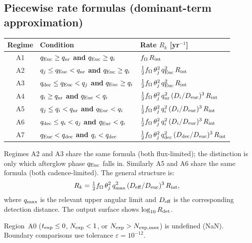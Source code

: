 \documentclass[11pt,a4paper]{article}
\begin{document}
\subsection{Piecewise rate formulas (dominant-term approximation)}

\begin{table}[h]
\centering
\small
\renewcommand{\arraystretch}{1.4}
\begin{tabular}{cll}
\toprule
Regime & Condition & Rate $R_k$ [yr$^{-1}$] \\
\midrule
A1 & $q_{\rm Euc}\ge q_{\rm nr}$ \textbf{and} $q_{\rm Euc}\ge q_i$ & $f_\Omega\,R_{\rm int}$ \\
A2 & $q_j\le q_{\rm Euc}<q_{\rm nr}$ \textbf{and} $q_{\rm Euc}\ge q_i$ & $\tfrac{1}{2}f_\Omega\,\theta_j^2\,q_{\rm Euc}^2\,R_{\rm int}$ \\
A3 & $q_{\rm dec}\le q_{\rm Euc}<q_j$ \textbf{and} $q_{\rm Euc}\ge q_i$ & $\tfrac{1}{2}f_\Omega\,\theta_j^2\,q_{\rm Euc}^2\,R_{\rm int}$ \\
A4 & $q_i\ge q_{\rm nr}$ \textbf{and} $q_{\rm Euc}<q_i$ & $\tfrac{1}{2}f_\Omega\,\theta_j^2\,q_{\rm nr}^2\,(D_i/D_{\rm euc})^3\,R_{\rm int}$ \\
A5 & $q_j\le q_i<q_{\rm nr}$ \textbf{and} $q_{\rm Euc}<q_i$ & $\tfrac{1}{2}f_\Omega\,\theta_j^2\,q_i^2\,(D_i/D_{\rm euc})^3\,R_{\rm int}$ \\
A6 & $q_{\rm dec}\le q_i<q_j$ \textbf{and} $q_{\rm Euc}<q_i$ & $\tfrac{1}{2}f_\Omega\,\theta_j^2\,q_i^2\,(D_i/D_{\rm euc})^3\,R_{\rm int}$ \\
A7 & $q_{\rm Euc}<q_{\rm dec}$ \textbf{and} $q_i<q_{\rm dec}$ & $\tfrac{1}{2}f_\Omega\,\theta_j^2\,q_{\rm dec}^2\,(D_{\rm dec}/D_{\rm euc})^3\,R_{\rm int}$ \\
\bottomrule
\end{tabular}
\end{table}

\noindent Regimes A2 and A3 share the same formula (both flux-limited); the distinction is only which afterglow phase $q_{\rm Euc}$ falls in. Similarly A5 and A6 share the same formula (both cadence-limited). The general structure is:
\[
R_k = \tfrac{1}{2}f_\Omega\,\theta_j^2\,q_{\rm max}^2\,(D_{\rm eff}/D_{\rm euc})^3\,R_{\rm int},
\]
where $q_{\rm max}$ is the relevant upper angular limit and $D_{\rm eff}$ is the corresponding detection distance. The output surface shows $\log_{10}R_{\rm det}$.

\noindent Region~A0 ($t_{\rm exp}\le0$, $N_{\rm exp}<1$, or $N_{\rm exp}>N_{\rm exp,max}$) is undefined (NaN).
Boundary comparisons use tolerance $\varepsilon=10^{-12}$.
\end{document}
